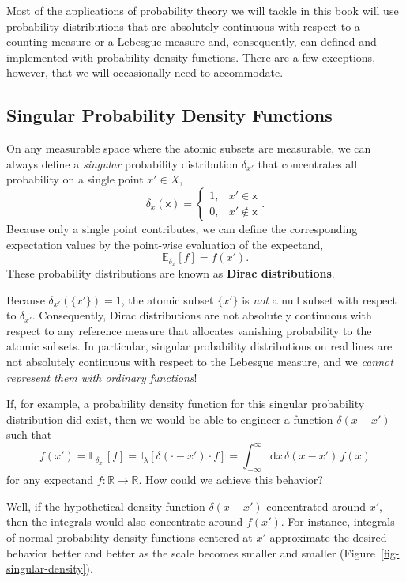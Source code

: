 \documentclass[
  letterpaper,
  DIV=11,
  numbers=noendperiod]{scrartcl}
\begin{document}
Most of the applications of probability theory we will tackle in this
book will use probability distributions that are absolutely continuous
with respect to a counting measure or a Lebesgue measure and,
consequently, can defined and implemented with probability density
functions. There are a few exceptions, however, that we will
occasionally need to accommodate.

\subsection{Singular Probability Density
Functions}\label{singular-probability-density-functions}

On any measurable space where the atomic subsets are measurable, we can
always define a \emph{singular} probability distribution \(\delta_{x'}\)
that concentrates all probability on a single point \(x' \in X\), \[
\delta_{x}(\mathsf{x}) =
\left\{
\begin{array}{rr}
1, & x' \in \mathsf{x} \\
0, & x' \notin \mathsf{x}
\end{array}
\right. .
\] Because only a single point contributes, we can define the
corresponding expectation values by the point-wise evaluation of the
expectand, \[
\mathbb{E}_{\delta_{x}} [f] = f(x').
\] These probability distributions are known as \textbf{Dirac
distributions}.

Because \(\delta_{x'}(\{ x' \}) = 1\), the atomic subset \(\{ x' \}\) is
\emph{not} a null subset with respect to \(\delta_{x'}\). Consequently,
Dirac distributions are not absolutely continuous with respect to any
reference measure that allocates vanishing probability to the atomic
subsets. In particular, singular probability distributions on real lines
are not absolutely continuous with respect to the Lebesgue measure, and
we \emph{cannot represent them with ordinary functions}!

If, for example, a probability density function for this singular
probability distribution did exist, then we would be able to engineer a
function \(\delta(x - x')\) such that \[
f(x')
= \mathbb{E}_{\delta_{x'}} [f]
= \mathbb{I}_{\lambda} [ \delta(\cdot - x') \cdot f]
= \int_{-\infty}^{\infty} \mathrm{d} x \, \delta(x - x') \, f(x)
\] for any expectand \(f: \mathbb{R} \rightarrow \mathbb{R}\). How could
we achieve this behavior?

Well, if the hypothetical density function \(\delta(x - x')\)
concentrated around \(x'\), then the integrals would also concentrate
around \(f(x')\). For instance, integrals of normal probability density
functions centered at \(x'\) approximate the desired behavior better and
better as the scale becomes smaller and smaller
(Figure~\ref{fig-singular-density}).
\end{document}
